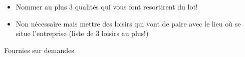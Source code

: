 \documentclass[twoside,letterpaper,12pt]{article}
\begin{document}
\begin{flushleft}
\bigbreak 

{\large \textbf{}}

\bigbreak

\begin{itemize}[label=\textbullet, font=  \scriptsize]
    \item Nommer au plus 3 qualités qui vous font resortirent du lot!
\end{itemize}

\bigbreak

{\large \textbf{}}

\smallbreak

\begin{itemize}[label=\textbullet, font=  \scriptsize]
    \item Non nécessaire mais mettre des loisirs qui vont de paire avec le lieu où se situe l'entreprise (liste de 3 loisirs au plus!)
\end{itemize}

\bigbreak

{\large \textbf{}}
\smallbreak

Fournies sur demandes

\end{flushleft}
\end{document}
